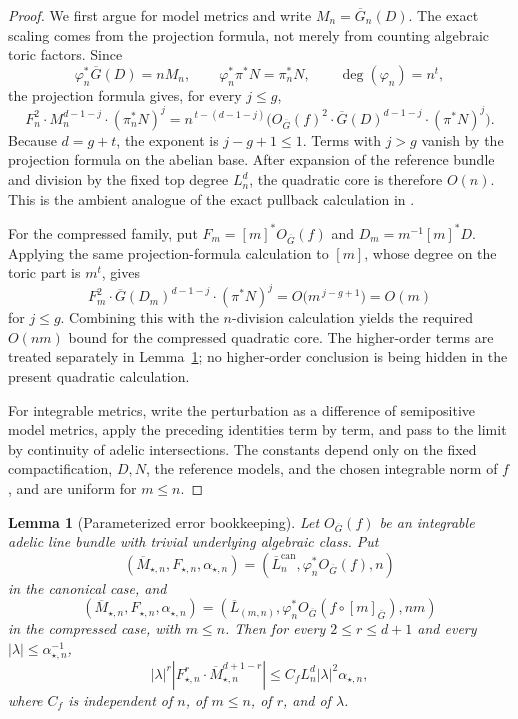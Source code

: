 \documentclass[10pt,a4paper]{amsart}
\theoremstyle{plain}
\newtheorem{lemma}[theorem]{Lemma}
\theoremstyle{plain}
\numberwithin{equation}{section}
\providecommand{\ol}{\overline}
\providecommand{\can}{\operatorname{can}}
\begin{document}
\begin{proof}
	We first argue for model metrics and write
	\(M_n=\overline G_n(D)\).  The exact scaling comes from the projection
	formula, not merely from counting algebraic toric factors.  Since
	\[
	\varphi_n^*\overline G(D)=nM_n,
	\qquad
	\varphi_n^*\pi^*N=\pi_n^*N,
	\qquad
	\deg(\varphi_n)=n^t,
	\]
	the projection formula gives, for every \(j\le g\),
	\[
	F_n^2\cdot M_n^{d-1-j}\cdot(\pi_n^*N)^j
	=
	n^{\,t-(d-1-j)}
	\bigl(O_{\overline G}(f)^2\cdot
	\overline G(D)^{d-1-j}\cdot(\pi^*N)^j\bigr).
	\]
	Because \(d=g+t\), the exponent is \(j-g+1\le1\).  Terms with \(j>g\)
	vanish by the projection formula on the abelian base.  After expansion of the
	reference bundle and division by the fixed top degree \(L_n^d\), the
	quadratic core is therefore \(O(n)\).  This is the ambient analogue of the
	exact pullback calculation in \cite[proof of Lemma~4.4, equations~(4.5)--(4.6)]{Ku1}.
	
	For the compressed family, put \(F_m=[m]^*O_{\overline G}(f)\) and
	\(D_m=m^{-1}[m]^*D\).  Applying the same projection-formula calculation to
	\([m]\), whose degree on the toric part is \(m^t\), gives
	\[
	F_m^2\cdot \overline G(D_m)^{d-1-j}\cdot(\pi^*N)^j
	=O\bigl(m^{\,j-g+1}\bigr)=O(m)
	\]
	for \(j\le g\).  Combining this with the \(n\)-division calculation yields
	the required \(O(nm)\) bound for the compressed quadratic core.  The
	higher-order terms are treated separately in
	Lemma~\ref{lem:parameterized-error-bookkeeping}; no higher-order conclusion is
	being hidden in the present quadratic calculation.
	
	For integrable metrics, write the perturbation as a difference of semipositive
	model metrics, apply the preceding identities term by term, and pass to the
	limit by continuity of adelic intersections.  The constants depend only on
	the fixed compactification, \(D,N\), the reference models, and the chosen
	integrable norm of \(f\), and are uniform for \(m\le n\).
\end{proof}

\begin{lemma}[Parameterized error bookkeeping]
	\label{lem:parameterized-error-bookkeeping}
	Let \(O_{\ol G}(f)\) be an integrable adelic line bundle with trivial
	underlying algebraic class.  Put
	\[
	(\ol M_{\star,n},F_{\star,n},\alpha_{\star,n})
	=
	(\ol L_n^{\can},\varphi_n^*O_{\ol G}(f),n)
	\]
	in the canonical case, and
	\[
	(\ol M_{\star,n},F_{\star,n},\alpha_{\star,n})
	=
	(\ol L_{(m,n)},\varphi_n^*O_{\ol G}(f\circ[m]_{\ol G}),nm)
	\]
	in the compressed case, with \(m\le n\).  Then for every
	\(2\le r\le d+1\) and every \(|\lambda|\le\alpha_{\star,n}^{-1}\),
	\[
	|\lambda|^r
	\left|
	F_{\star,n}^r\cdot \ol M_{\star,n}^{d+1-r}
	\right|
	\le
	C_f L_n^d |\lambda|^2\alpha_{\star,n},
	\]
	where \(C_f\) is independent of \(n\), of \(m\le n\), of \(r\), and of
	\(\lambda\).
\end{lemma}
\end{document}
